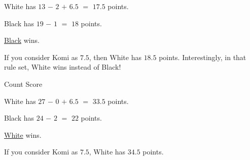 \documentclass[a4paper,12pt]{extarticle}
\begin{document}
\begin{multicols}{3}

 White has \ul{$13$} $-$ \ul{$2$} $+$ \ul{$6.5$} $=$ \ul{$17.5$} points.

 Black has \ul{$19$} $-$ \ul{$1$} $=$ \ul{$18$} points.

 \ul{Black} wins.

If you consider Komi as $7.5$, then White has $18.5$ points. Interestingly, in that rule set, White wins instead of Black!
 
 \bigskip
 
 Count Score

\bigskip
 
\cleargoban
{}
\showgoban[a1,i9]


White has \ul{$27$} $-$ \ul{$0$} $+$ \ul{$6.5$} $=$ \ul{$33.5$} points.

Black has \ul{$24$} $-$ \ul{$2$} $=$ \ul{$22$} points.

\ul{White} wins.

If you consider Komi as $7.5$, White has $34.5$ points.

\end{multicols}
\end{document}
